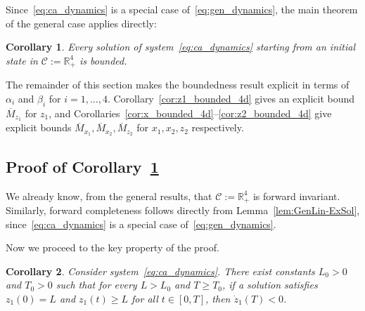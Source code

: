 \documentclass{article}
\newtheorem{corollary}{Corollary}
\begin{document}
Since~\eqref{eq:ca_dynamics} is a special case of~\eqref{eq:gen_dynamics}, 
the main theorem of the general case applies directly:

\begin{corollary}\label{cor:4d_bounded}
    Every solution of system~\eqref{eq:ca_dynamics} starting from an initial 
    state in $\mathcal{C}:=\mathbb{R}^4_+$ is bounded.
\end{corollary}

The remainder of this section makes the boundedness result explicit in terms 
of $\alpha_i$ and $\beta_i$ for $i=1,\dots,4$.
Corollary~\ref{cor:z1_bounded_4d} gives an explicit bound $\overline{M}_{z_1}$ 
for $z_1$, and Corollaries~\ref{cor:x_bounded_4d}--\ref{cor:z2_bounded_4d} give explicit bounds 
$\overline{M}_{x_1}, \overline{M}_{x_2}, \overline{M}_{z_2}$ for $x_1, x_2, z_2$ respectively. 

\subsection{Proof of Corollary~\ref{cor:4d_bounded}}

We already know, from the general results, that $\mathcal{C}:=\mathbb{R}^4_+$ 
is forward invariant. 
Similarly, forward completeness 
follows directly from Lemma~\ref{lem:GenLin-ExSol}, since~\eqref{eq:ca_dynamics} 
is a special case of~\eqref{eq:gen_dynamics}.

Now we proceed to the key property of the proof.

\begin{corollary}\label{cor:z1_decrease}
    Consider system~\eqref{eq:ca_dynamics}. There exist constants $L_0>0$ and 
    $T_0>0$ such that for every $L>L_0$ and $T\ge T_0$, if a solution satisfies 
    $z_1(0)=L$ and $z_1(t)\ge L$ for all $t\in[0,T]$, then $\dot z_1(T)<0$.
\end{corollary}
\end{document}
